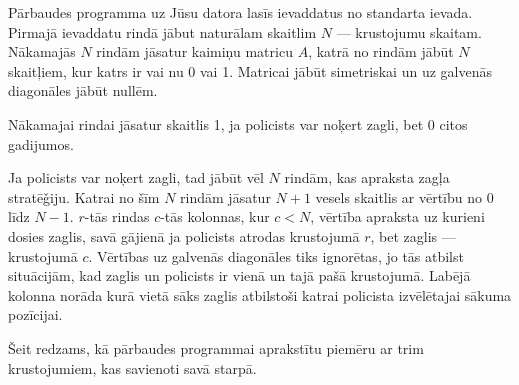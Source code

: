 \documentclass{boi2014-lv}
\begin{document}
    \Experimentation
    
	Pārbaudes programma uz Jūsu datora lasīs ievaddatus no standarta ievada. Pirmajā ievaddatu rindā jābut naturālam skaitlim $N$ --- krustojumu skaitam. Nākamajās $N$ rindām jāsatur kaimiņu matricu $A$, katrā no rindām jābūt $N$ skaitļiem, kur katrs ir vai nu 0 vai 1. Matricai jābūt simetriskai un uz galvenās diagonāles jābūt nullēm. 

	Nākamajai rindai jāsatur skaitlis 1, ja policists var noķert zagli, bet 0 citos gadijumos.

	Ja policists var noķert zagli, tad jābūt vēl $N$ rindām, kas apraksta zagļa stratē\v{g}iju. Katrai no šīm $N$ rindām jāsatur $N+1$ vesels skaitlis ar vērtību no 0 līdz $N-1$. $r$-tās rindas $c$-tās kolonnas, kur $c < N$, vērtība apraksta uz kurieni dosies zaglis, savā gājienā ja policists atrodas krustojumā $r$, bet zaglis --- krustojumā $c$. Vērtības uz galvenās diagonāles tiks ignorētas, jo tās atbilst situācijām, kad zaglis un policists ir vienā un tajā pašā krustojumā. Labējā kolonna norāda kurā vietā sāks zaglis atbilstoši katrai policista izvēlētajai sākuma pozīcijai.

	Šeit redzams, kā pārbaudes programmai aprakstītu piemēru ar trim krustojumiem, kas savienoti savā starpā.
	
\end{document}
